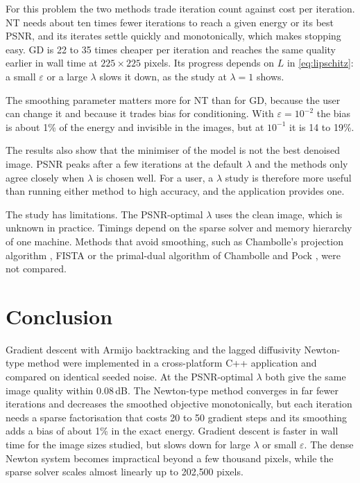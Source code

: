 \documentclass[conference,a4paper]{IEEEtran}
\begin{document}
For this problem the two methods trade iteration count against cost per iteration. NT needs about ten times fewer iterations to reach a given energy or its best PSNR, and its iterates settle quickly and monotonically, which makes stopping easy. GD is 22 to 35 times cheaper per iteration and reaches the same quality earlier in wall time at $225\times225$ pixels. Its progress depends on $L$ in \eqref{eq:lipschitz}: a small $\varepsilon$ or a large $\lambda$ slows it down, as the study at $\lambda=1$ shows.

The smoothing parameter matters more for NT than for GD, because the user can change it and because it trades bias for conditioning. With $\varepsilon=10^{-2}$ the bias is about 1\% of the energy and invisible in the images, but at $10^{-1}$ it is 14 to 19\%.

The results also show that the minimiser of the model is not the best denoised image. PSNR peaks after a few iterations at the default $\lambda$ and the methods only agree closely when $\lambda$ is chosen well. For a user, a $\lambda$ study is therefore more useful than running either method to high accuracy, and the application provides one.

The study has limitations. The PSNR-optimal $\lambda$ uses the clean image, which is unknown in practice. Timings depend on the sparse solver and memory hierarchy of one machine. Methods that avoid smoothing, such as Chambolle's projection algorithm \cite{chambolle2004}, FISTA \cite{beck2009} or the primal-dual algorithm of Chambolle and Pock \cite{chambolle2011}, were not compared.

\section{Conclusion}

Gradient descent with Armijo backtracking and the lagged diffusivity Newton-type method were implemented in a cross-platform C++ application and compared on identical seeded noise. At the PSNR-optimal $\lambda$ both give the same image quality within 0.08\,dB. The Newton-type method converges in far fewer iterations and decreases the smoothed objective monotonically, but each iteration needs a sparse factorisation that costs 20 to 50 gradient steps and its smoothing adds a bias of about 1\% in the exact energy. Gradient descent is faster in wall time for the image sizes studied, but slows down for large $\lambda$ or small $\varepsilon$. The dense Newton system becomes impractical beyond a few thousand pixels, while the sparse solver scales almost linearly up to 202{,}500 pixels.



\end{document}
